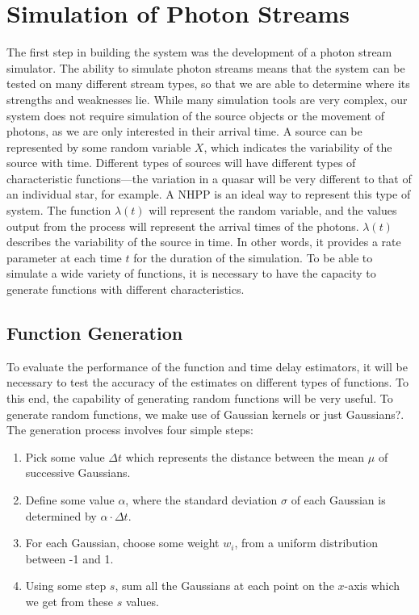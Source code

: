 \documentclass[a4paper,11pt]{article}
\begin{document}
\section{Simulation of Photon Streams}
\label{sec-3}

The first step in building the system was the development of a photon stream
simulator. The ability to simulate photon streams means that the system can be
tested on many different stream types, so that we are able to determine where
its strengths and weaknesses lie. While many simulation tools are very complex,
our system does not require simulation of the source objects or the movement of
photons, as we are only interested in their arrival time. A source can be
represented by some random variable $X$, which indicates the variability of the
source with time. Different types of sources will have different types of
characteristic functions---the variation in a quasar will be very different to
that of an individual star, for example. A NHPP is an ideal way to represent
this type of system. The function $\lambda(t)$ will represent the random
variable, and the values output from the process will represent the arrival
times of the photons. $\lambda(t)$ describes the variability of the source in
time. In other words, it provides a rate parameter at each time $t$ for the
duration of the simulation. To be able to simulate a wide variety of functions,
it is necessary to have the capacity to generate functions with different
characteristics.
\subsection{Function Generation}
\label{sec-3-1}

To evaluate the performance of the function and time delay estimators, it will
be necessary to test the accuracy of the estimates on different types of
functions. To this end, the capability of generating random functions will be
very useful. To generate random functions, we make use of \large{Gaussian
kernels or just Gaussians?}. The generation process involves four simple steps:
\begin{enumerate}
\item Pick some value $\Delta t$ which represents the distance between the mean
   $\mu$ of successive Gaussians.
\item Define some value $\alpha$, where the standard deviation $\sigma$ of each
   Gaussian is determined by $\alpha\cdot\Delta t$.
\item For each Gaussian, choose some weight $w_i$, from a uniform distribution
   between -1 and 1.
\item Using some step $s$, sum all the Gaussians at each point on the $x$-axis which
   we get from these $s$ values.
\end{enumerate}
\end{document}
